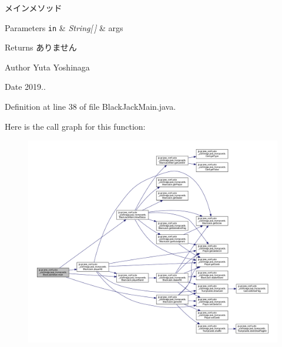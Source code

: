 メインメソッド 


\begin{DoxyParams}[1]{Parameters}
\mbox{\tt in}  & {\em String\mbox{[}$\,$\mbox{]}} & args \\
\hline
\end{DoxyParams}
\begin{DoxyReturn}{Returns}
ありません 
\end{DoxyReturn}
\begin{DoxyAuthor}{Author}
Yuta Yoshinaga 
\end{DoxyAuthor}
\begin{DoxyDate}{Date}
2019.. 
\end{DoxyDate}


Definition at line 38 of file Black\+Jack\+Main.\+java.

Here is the call graph for this function\+:
\nopagebreak
\begin{figure}[H]
\begin{center}
\leavevmode
\includegraphics[width=350pt]{classjp_1_1gr_1_1java__conf_1_1yuta__yoshinaga_1_1java__trumpcards_1_1_black_jack_main_af395b1fc47f9ef84101a3c13c2310ed6_cgraph}
\end{center}
\end{figure}
\mbox{\label{classjp_1_1gr_1_1java__conf_1_1yuta__yoshinaga_1_1java__trumpcards_1_1_black_jack_main_aefaaf9d1dfc330af971cb1a167a9e8d9}} 
